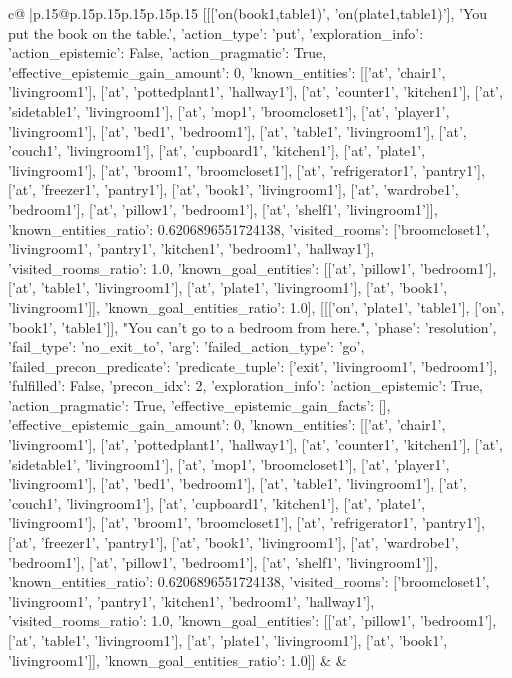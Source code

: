 \documentclass{article}
\begin{document}
{\begin{supertabular}{c@{$\;$}|p{.15\linewidth}@{}p{.15\linewidth}p{.15\linewidth}p{.15\linewidth}p{.15\linewidth}p{.15\linewidth}}
{{{	 [[['on(book1,table1)', 'on(plate1,table1)'], 'You put the book on the table.', {'action_type': 'put', 'exploration_info': {'action_epistemic': False, 'action_pragmatic': True, 'effective_epistemic_gain_amount': 0, 'known_entities': [['at', 'chair1', 'livingroom1'], ['at', 'pottedplant1', 'hallway1'], ['at', 'counter1', 'kitchen1'], ['at', 'sidetable1', 'livingroom1'], ['at', 'mop1', 'broomcloset1'], ['at', 'player1', 'livingroom1'], ['at', 'bed1', 'bedroom1'], ['at', 'table1', 'livingroom1'], ['at', 'couch1', 'livingroom1'], ['at', 'cupboard1', 'kitchen1'], ['at', 'plate1', 'livingroom1'], ['at', 'broom1', 'broomcloset1'], ['at', 'refrigerator1', 'pantry1'], ['at', 'freezer1', 'pantry1'], ['at', 'book1', 'livingroom1'], ['at', 'wardrobe1', 'bedroom1'], ['at', 'pillow1', 'bedroom1'], ['at', 'shelf1', 'livingroom1']], 'known_entities_ratio': 0.6206896551724138, 'visited_rooms': ['broomcloset1', 'livingroom1', 'pantry1', 'kitchen1', 'bedroom1', 'hallway1'], 'visited_rooms_ratio': 1.0, 'known_goal_entities': [['at', 'pillow1', 'bedroom1'], ['at', 'table1', 'livingroom1'], ['at', 'plate1', 'livingroom1'], ['at', 'book1', 'livingroom1']], 'known_goal_entities_ratio': 1.0}}], [[['on', 'plate1', 'table1'], ['on', 'book1', 'table1']], "You can't go to a bedroom from here.", {'phase': 'resolution', 'fail_type': 'no_exit_to', 'arg': {'failed_action_type': 'go', 'failed_precon_predicate': {'predicate_tuple': ['exit', 'livingroom1', 'bedroom1'], 'fulfilled': False, 'precon_idx': 2}}, 'exploration_info': {'action_epistemic': True, 'action_pragmatic': True, 'effective_epistemic_gain_facts': [], 'effective_epistemic_gain_amount': 0, 'known_entities': [['at', 'chair1', 'livingroom1'], ['at', 'pottedplant1', 'hallway1'], ['at', 'counter1', 'kitchen1'], ['at', 'sidetable1', 'livingroom1'], ['at', 'mop1', 'broomcloset1'], ['at', 'player1', 'livingroom1'], ['at', 'bed1', 'bedroom1'], ['at', 'table1', 'livingroom1'], ['at', 'couch1', 'livingroom1'], ['at', 'cupboard1', 'kitchen1'], ['at', 'plate1', 'livingroom1'], ['at', 'broom1', 'broomcloset1'], ['at', 'refrigerator1', 'pantry1'], ['at', 'freezer1', 'pantry1'], ['at', 'book1', 'livingroom1'], ['at', 'wardrobe1', 'bedroom1'], ['at', 'pillow1', 'bedroom1'], ['at', 'shelf1', 'livingroom1']], 'known_entities_ratio': 0.6206896551724138, 'visited_rooms': ['broomcloset1', 'livingroom1', 'pantry1', 'kitchen1', 'bedroom1', 'hallway1'], 'visited_rooms_ratio': 1.0, 'known_goal_entities': [['at', 'pillow1', 'bedroom1'], ['at', 'table1', 'livingroom1'], ['at', 'plate1', 'livingroom1'], ['at', 'book1', 'livingroom1']], 'known_goal_entities_ratio': 1.0}}]] 
	  } 
	   } 
	   } 
	 & & \\ 
 


\end{supertabular}}
\end{document}
